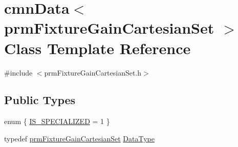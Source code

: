 \hypertarget{classcmn_data_3_01prm_fixture_gain_cartesian_set_01_4}{\section{cmn\-Data$<$ prm\-Fixture\-Gain\-Cartesian\-Set $>$ Class Template Reference}
\label{classcmn_data_3_01prm_fixture_gain_cartesian_set_01_4}
}


{\ttfamily \#include $<$prm\-Fixture\-Gain\-Cartesian\-Set.\-h$>$}

\subsection*{Public Types}
\begin{DoxyCompactItemize}
\item 
enum \{ \hyperlink{classcmn_data_3_01prm_fixture_gain_cartesian_set_01_4_aee948705f580f6615419227b74f70d81a85ef12a82d88c8ec41c20dd41cb630c4}{I\-S\-\_\-\-S\-P\-E\-C\-I\-A\-L\-I\-Z\-E\-D} = 1
 \}
\item 
typedef \hyperlink{classprm_fixture_gain_cartesian_set}{prm\-Fixture\-Gain\-Cartesian\-Set} \hyperlink{classcmn_data_3_01prm_fixture_gain_cartesian_set_01_4_acc465bb24d169f220385b16e38a8e7ea}{Data\-Type}
\end{DoxyCompactItemize}
